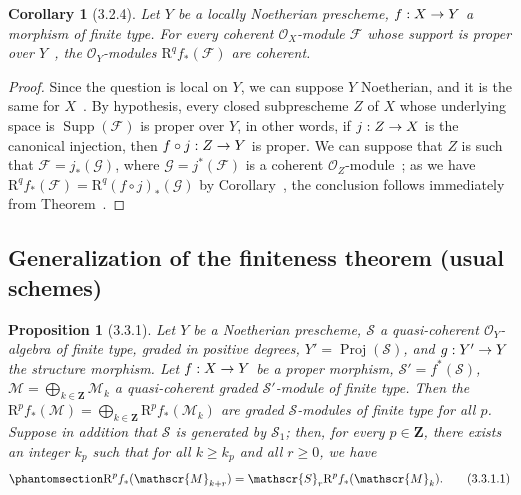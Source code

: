 \documentclass[oneside]{amsart}
\theoremstyle{ega-env-style}
\theoremstyle{ega-thm-env-style}
\newtheorem*{proposition}{Proposition}
\newtheorem*{corollary}{Corollary}
\theoremstyle{ega-defn-env-style}
\def\mathcal{\mathscr}
\def\sh{\mathcal}                   %
\def\bb{\mathbf}                    %
\def\geq{\geqslant}                 %
\def\RR{\mathrm{R}}                 %
\def\Proj{\operatorname{Proj}}
\def\Supp{\operatorname{Supp}}
\renewcommand{\to}{\mathchoice{\longrightarrow}{\rightarrow}{\rightarrow}{\rightarrow}}
\newcommand{\oldpage}[2][]{{\marginnote{\normalfont{\textbf{#1}~|~#2}}}\ignorespaces}
\let\EGAOriginalLabel\label
\renewcommand{\label}[1]{\phantomsection\EGAOriginalLabel{#1}}
\begin{document}
\begin{corollary}[3.2.4]
\label{III.3.2.4}
Let $Y$ be a locally Noetherian prescheme, $f:X\to Y$ a morphism of finite type.
For every coherent $\sh{O}_X$-module $\sh{F}$ whose support is proper over $Y$~, the $\sh{O}_Y$-modules $\RR^q f_*(\sh{F})$ are coherent.
\end{corollary}

\oldpage[III]{118}
\begin{proof}
Since the question is local on $Y$, we can suppose $Y$ Noetherian, and it is the same for $X$~.
By hypothesis, every closed subprescheme $Z$ of $X$ whose underlying space is $\Supp(\sh{F})$ is proper over $Y$, in other words, if $j:Z\to X$ is the canonical injection, then $f\circ j:Z\to Y$ is proper.
We can suppose that $Z$ is such that $\sh{F}=j_*(\sh{G})$, where $\sh{G}=j^*(\sh{F})$ is a coherent $\sh{O}_Z$-module~; as we have $\RR^q f_*(\sh{F})=\RR^q(f\circ j)_*(\sh{G})$ by Corollary~, the conclusion follows immediately from Theorem~.
\end{proof}

\subsection{Generalization of the finiteness theorem (usual schemes)}
\label{subsection:III.3.3}

\begin{proposition}[3.3.1]
\label{III.3.3.1}
Let $Y$ be a Noetherian prescheme, $\sh{S}$ a quasi-coherent $\sh{O}_Y$-algebra of finite type, graded in positive degrees, $Y'=\Proj(\sh{S})$, and $g:Y'\to Y$ the structure morphism.
Let $f:X\to Y$ be a proper morphism, $\sh{S}'=f^*(\sh{S})$, $\sh{M}=\bigoplus_{k\in\bb{Z}}\sh{M}_k$ a quasi-coherent graded $\sh{S}'$-module of finite type.
Then the $\RR^p f_*(\sh{M})=\bigoplus_{k\in\bb{Z}}\RR^p f_*(\sh{M}_k)$ are graded $\sh{S}$-modules of finite type for all $p$.
Suppose in addition that $\sh{S}$ is generated by $\sh{S}_1$; then, for every $p\in\bb{Z}$, there exists an integer $k_p$ such that for all $k\geq k_p$ and all $r\geq 0$, we have
\[
\label{III.3.3.1.1}
  \RR^p f_*(\sh{M}_{k+r})=\sh{S}_r\RR^p f_*(\sh{M}_k).
  \tag{3.3.1.1}
\] 
\end{proposition}
\end{document}
